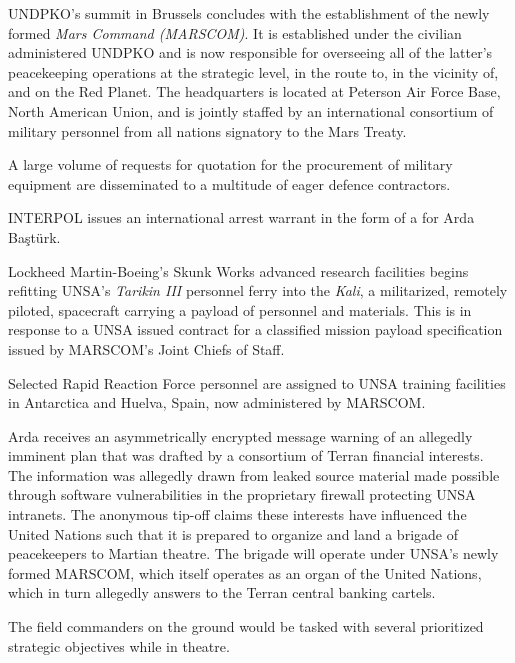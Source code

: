 UNDPKO's summit in Brussels concludes with the establishment of the newly formed {\it Mars Command (MARSCOM)}. It is established under the civilian administered UNDPKO and is now responsible for overseeing all of the latter's peacekeeping operations at the strategic level, in the route to, in the vicinity of, and on the Red Planet. The headquarters is located at Peterson Air Force Base, North American Union, and is jointly staffed by an international consortium of military personnel from all nations signatory to the Mars Treaty.

A large volume of requests for quotation for the procurement of military equipment are disseminated to a multitude of eager defence contractors.
\StopTimelineDate

INTERPOL issues an international arrest warrant in the form of a  for Arda Baştürk.
\StopTimelineDate

Lockheed Martin-Boeing's Skunk Works advanced research facilities begins refitting UNSA's {\it Tarikin III} personnel ferry into the {\it Kali}, a militarized, remotely piloted, spacecraft carrying a payload of personnel and materials. This is in response to a UNSA issued contract for a classified mission payload specification issued by MARSCOM's Joint Chiefs of Staff.
\StopTimelineDate

Selected Rapid Reaction Force personnel are assigned to UNSA training facilities in Antarctica and Huelva, Spain, now administered by MARSCOM.
\StopTimelineDate

Arda receives an asymmetrically encrypted message warning of an allegedly imminent plan that was drafted by a consortium of Terran financial interests. The information was allegedly drawn from leaked source material made possible through software vulnerabilities in the proprietary firewall protecting UNSA intranets. The anonymous tip-off claims these interests have influenced the United Nations such that it is prepared to organize and land a brigade of peacekeepers to Martian theatre. The brigade will operate under UNSA's newly formed MARSCOM, which itself operates as an organ of the United Nations, which in turn allegedly answers to the Terran central banking cartels. 

The field commanders on the ground would be tasked with several prioritized strategic objectives while in theatre. 

